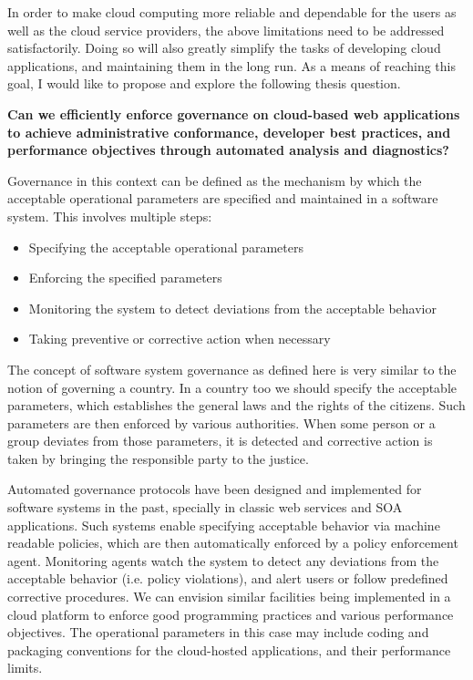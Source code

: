 In order to make cloud computing more reliable and dependable for the users as well
as the cloud service providers, the above limitations need to be addressed satisfactorily.
Doing so will also greatly simplify the tasks of developing cloud applications, and maintaining 
them in the long run. As a means of reaching this goal, I would like to propose and explore the
following thesis question.

{\bf Can we efficiently enforce governance on cloud-based web applications to achieve 
administrative conformance, developer best practices, and performance objectives through 
automated analysis and diagnostics?} 

Governance in this context can be defined as the mechanism by which the acceptable 
operational parameters are specified and maintained in a software system. This involves 
multiple steps:
\begin{itemize}
\item Specifying the acceptable operational parameters
\item Enforcing the specified parameters
\item Monitoring the system to detect deviations from the acceptable behavior
\item Taking preventive or corrective action when necessary
\end{itemize}

The concept of software system governance as defined here is very similar to the
notion of governing a country. In a country too we should specify the acceptable
parameters, which establishes the general laws and the rights of the citizens. Such 
parameters are then
enforced by various authorities. When some person or a group deviates from those parameters,
it is detected and corrective action is taken by bringing the responsible party to the justice.

Automated governance protocols have been designed and implemented for software systems in
the past, specially in classic web services and SOA applications. Such systems enable specifying
acceptable behavior via machine readable policies, which are then automatically enforced by
a policy enforcement agent. Monitoring agents watch the system to detect any deviations from
the acceptable behavior (i.e. policy violations), and alert users or follow predefined corrective
procedures. We can envision similar facilities being implemented in a cloud platform to 
enforce good programming practices and various performance objectives. The operational
parameters in this case may include coding and packaging conventions for the cloud-hosted
applications, and their performance limits.

